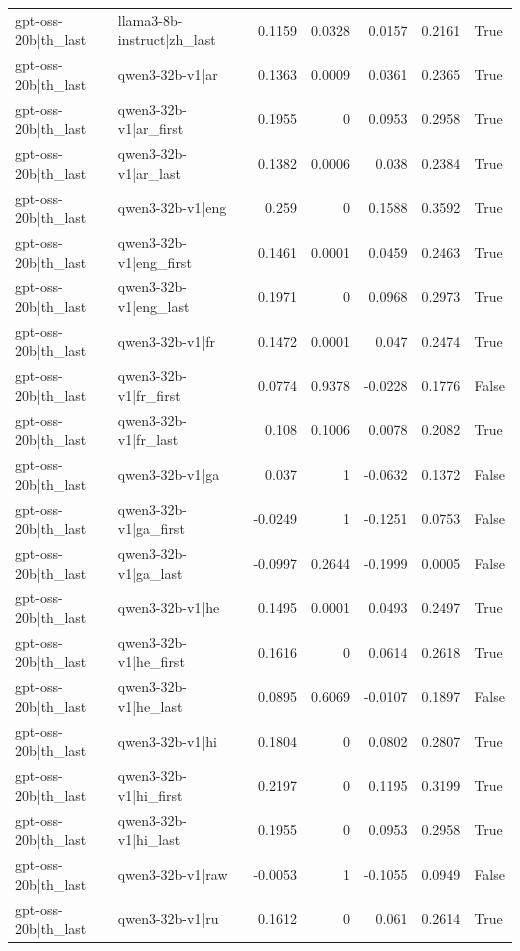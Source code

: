 \begin{table}
\begin{tabular}{l l r r r r l}
gpt-oss-20b|th_last & llama3-8b-instruct|zh_last & 0.1159 & 0.0328 & 0.0157 & 0.2161 & True \\
gpt-oss-20b|th_last & qwen3-32b-v1|ar & 0.1363 & 0.0009 & 0.0361 & 0.2365 & True \\
gpt-oss-20b|th_last & qwen3-32b-v1|ar_first & 0.1955 & 0 & 0.0953 & 0.2958 & True \\
gpt-oss-20b|th_last & qwen3-32b-v1|ar_last & 0.1382 & 0.0006 & 0.038 & 0.2384 & True \\
gpt-oss-20b|th_last & qwen3-32b-v1|eng & 0.259 & 0 & 0.1588 & 0.3592 & True \\
gpt-oss-20b|th_last & qwen3-32b-v1|eng_first & 0.1461 & 0.0001 & 0.0459 & 0.2463 & True \\
gpt-oss-20b|th_last & qwen3-32b-v1|eng_last & 0.1971 & 0 & 0.0968 & 0.2973 & True \\
gpt-oss-20b|th_last & qwen3-32b-v1|fr & 0.1472 & 0.0001 & 0.047 & 0.2474 & True \\
gpt-oss-20b|th_last & qwen3-32b-v1|fr_first & 0.0774 & 0.9378 & -0.0228 & 0.1776 & False \\
gpt-oss-20b|th_last & qwen3-32b-v1|fr_last & 0.108 & 0.1006 & 0.0078 & 0.2082 & True \\
gpt-oss-20b|th_last & qwen3-32b-v1|ga & 0.037 & 1 & -0.0632 & 0.1372 & False \\
gpt-oss-20b|th_last & qwen3-32b-v1|ga_first & -0.0249 & 1 & -0.1251 & 0.0753 & False \\
gpt-oss-20b|th_last & qwen3-32b-v1|ga_last & -0.0997 & 0.2644 & -0.1999 & 0.0005 & False \\
gpt-oss-20b|th_last & qwen3-32b-v1|he & 0.1495 & 0.0001 & 0.0493 & 0.2497 & True \\
gpt-oss-20b|th_last & qwen3-32b-v1|he_first & 0.1616 & 0 & 0.0614 & 0.2618 & True \\
gpt-oss-20b|th_last & qwen3-32b-v1|he_last & 0.0895 & 0.6069 & -0.0107 & 0.1897 & False \\
gpt-oss-20b|th_last & qwen3-32b-v1|hi & 0.1804 & 0 & 0.0802 & 0.2807 & True \\
gpt-oss-20b|th_last & qwen3-32b-v1|hi_first & 0.2197 & 0 & 0.1195 & 0.3199 & True \\
gpt-oss-20b|th_last & qwen3-32b-v1|hi_last & 0.1955 & 0 & 0.0953 & 0.2958 & True \\
gpt-oss-20b|th_last & qwen3-32b-v1|raw & -0.0053 & 1 & -0.1055 & 0.0949 & False \\
gpt-oss-20b|th_last & qwen3-32b-v1|ru & 0.1612 & 0 & 0.061 & 0.2614 & True \\

\end{tabular}
\end{table}
